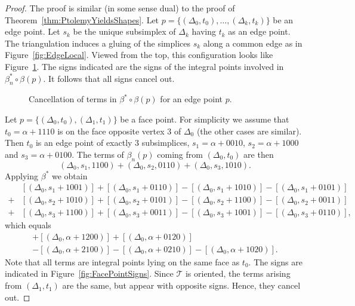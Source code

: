 \documentclass[12pt]{amsart}
\theoremstyle{definition}
\numberwithin{equation}{section}
\def\T{\mathcal{T}}
\begin{document}
\begin{proof}
The proof is similar (in some sense dual) to the proof of Theorem~\ref{thm:PtolemyYieldsShapes}. 
Let $p=\{(\Delta_0,t_0),\dots,(\Delta_k,t_k)\}$ be an edge point. Let $s_k$ be the unique subsimplex of $\Delta_k$ having $t_k$ as an edge point. The triangulation induces a gluing of the simplices $s_k$ along a common edge as in Figure~\ref{fig:EdgeLocal}. Viewed from the top, this configuration looks like Figure~\ref{fig:EdgePointCancellation}. The signs indicated are the signs of the integral points involved in $\beta_n^*\circ\beta(p)$.
It follows that all signs cancel out.

\begin{figure}[htb]
\begin{center}
\scalebox{0.75}{
}
\end{center}
\caption{Cancellation of terms in $\beta^*\circ\beta(p)$ for an edge point $p$.}\label{fig:EdgePointCancellation}
\end{figure}

Let $p=\{(\Delta_0,t_0),(\Delta_1,t_1)\}$ be a face point. For simplicity we assume that $t_0=\alpha+1110$ is on the face opposite vertex $3$ of $\Delta_0$ (the other cases are similar). Then $t_0$ is an edge point of exactly $3$ subsimplices, $s_1=\alpha+0010$, $s_2=\alpha+1000$ and $s_3=\alpha+0100$. The terms of $\beta_n(p)$ coming from $(\Delta_0,t_0)$ are then
\begin{equation}
(\Delta_0,s_1,1100)+(\Delta_0,s_2,0110)+(\Delta_0,s_3,1010).
\end{equation}
Applying $\beta^*$ we obtain
\begin{equation}
\begin{aligned}
&[(\Delta_0,s_1+1001)]+[(\Delta_0,s_1+0110)]-[(\Delta_0,s_1+1010)]-[(\Delta_0,s_1+0101)]\\
+&[(\Delta_0,s_2+1010)]+[(\Delta_0,s_2+0101)]-[(\Delta_0,s_2+1100)]-[(\Delta_0,s_2+0011)]\\
+&[(\Delta_0,s_3+1100)]+[(\Delta_0,s_3+0011)]-[(\Delta_0,s_3+1001)]-[(\Delta_0,s_3+0110)],
\end{aligned}
\end{equation}
which equals
\begin{multline}
[(\Delta_0,\alpha+2010)]+[(\Delta_0,\alpha+1200)]+[(\Delta_0,\alpha+0120)]\\-[(\Delta_0,\alpha+2100)]-[(\Delta_0,\alpha+0210)]-[(\Delta_0,\alpha+1020)].
\end{multline}
Note that all terms are integral points lying on the same face as $t_0$. The signs are indicated in Figure~\ref{fig:FacePointSigns}. Since $\T$ is oriented, the terms arising from $(\Delta_1,t_1)$ are the same, but appear with opposite signs. Hence, they cancel out.


\end{proof}
\end{document}
